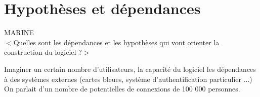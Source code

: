 

\section{Hypothèses et dépendances}
MARINE\\
$<$Quelles sont les dépendances et les hypothèses qui vont orienter la construction du logiciel ?$>$

Imaginer un certain nombre d'utilisateurs, la capacité du logiciel
les dépendances à des systèmes externes (cartes bleues, système d'authentification particulier ...)
On parlait d'un nombre de potentielles de connexions de 100 000 personnes.
